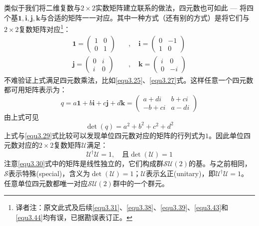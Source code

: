 类似于我们将二维复数与$2 \times 2$实数矩阵建立联系的做法，四元数也可如此 --- 将四个基$\mathbf{1,i,j,k}$与合适的矩阵一一对应。其中一种方式（还有别的方式）是将它们与$2 \times 2$复数矩阵对应\footnote{译者注：原文此式及后续\eqref{equ3.31}、\eqref{equ3.38}、\eqref{equ3.39}、\eqref{equ3.43}和\eqref{equ3.44}均有误，已据勘误表订正。}：
\begin{align}
\mathbf{1} = \begin{pmatrix}
				1 & 0 \\ 0 & 1
			 \end{pmatrix}
\quad &, \quad
\mathbf{i} = \begin{pmatrix}
				0 & -1 \\ 1 & 0
			 \end{pmatrix}
\nonumber \\
\label{equ3.30}
\mathbf{j} = \begin{pmatrix}
				0 & i \\ i & 0
			 \end{pmatrix}
\quad &, \quad
\mathbf{k} = \begin{pmatrix}
				i & 0 \\
				0 & -i
			 \end{pmatrix}
\end{align}
不难验证上式满足四元数乘法，比如\eqref{equ3.25}、\eqref{equ3.27}式。这样任意一个四元数都可用矩阵表示为：
\begin{equation}
\label{equ3.31}
q = a\mathbf{1} + b\mathbf{i} + c\mathbf{j} + d\mathbf{k} = \begin{pmatrix}
	a + di & b + ci \\
	- b + ci & a - di
	\end{pmatrix}
\end{equation}
由上式可见
\begin{equation}
\label{equ3.32}
\det(q) = a^2 + b^2 + c^2 + d^2
\end{equation}
上式与\eqref{equ3.29}式比较可以发现单位四元数对应的矩阵的行列式为$1$。因此单位四元数对应的$2 \times 2$复数矩阵$\mathcal{U}$满足：
\begin{equation}
\label{equ3.33}
\mathcal{U}^\dag \mathcal{U} = 1, \quad \text{且} \det(\mathcal{U}) = 1
\end{equation}
注意\eqref{equ3.30}式中的矩阵是线性独立的，它们构成群$\mathcal{SU}(2)$的基。与之前相同，$\mathcal{S}$表示特殊(special)，含义为$\det (\mathcal{U}) = 1$；$\mathcal{U}$表示幺正(unitary)，即$\mathcal{U}^\dag \mathcal{U} = 1$。任意单位四元数都唯一对应$\mathcal{SU}(2)$群中的一个群元。

